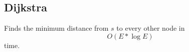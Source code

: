 \subsection{Dijkstra}

Finds the minimum distance from $s$ to every other node in $$O(E*\log{E})$$ time.
